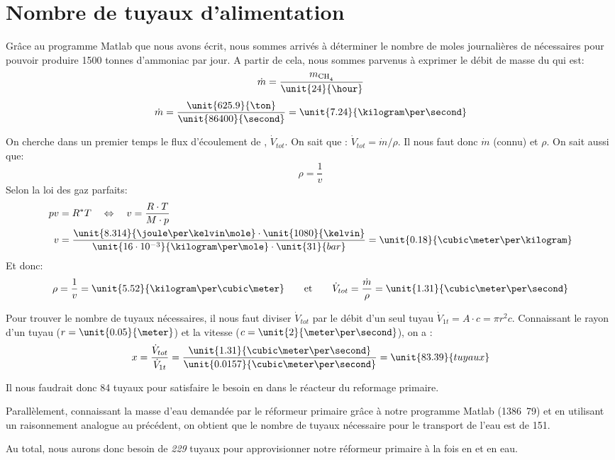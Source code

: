 \section{Nombre de tuyaux d'alimentation}

Grâce au programme Matlab que nous avons écrit, nous sommes arrivés à déterminer le nombre de moles journalières de  nécessaires pour pouvoir produire 1500 tonnes d'ammoniac par jour. A partir de cela, nous sommes parvenus à exprimer le débit de masse du  qui est:
    $$\dot{m}=\frac{m_{\ce{CH4}}}{\unit{24}{\hour}}$$
    $$\dot{m}=\frac{\unit{625.9}{\ton}}{\unit{86400}{\second}}=\unit{7.24}{\kilogram\per\second}$$

On cherche dans un premier temps le flux d'écoulement de , $\dot{V}_{tot}$. On sait que :
$\dot{V}_{tot}={\dot{m}}/{\rho}$.
Il nous faut donc $\dot{m}$ (connu) et $\rho$. On sait aussi que:
\[ \rho = \frac{1}{v} \]
Selon la loi des gaz parfaits:
\begin{align*}
    pv &= R^{*}T \quad\Leftrightarrow\quad v = \frac{R\cdot T}{M\cdot p} \\
    v &= \frac{\unit{8.314}{\joule\per\kelvin\mole}\cdot\unit{1080}{\kelvin}}{\unit{16\cdot10^{-3}}{\kilogram\per\mole}\cdot\unit{31}{bar}}=\unit{0.18}{\cubic\meter\per\kilogram}
\end{align*}
Et donc:
\[
    \rho = \frac{1}{v} = \unit{5.52}{\kilogram\per\cubic\meter}
    \qquad\text{et}\qquad
    \dot{V}_{tot} = \frac{\dot{m}}{\rho}=\unit{1.31}{\cubic\meter\per\second}
\]

Pour trouver le nombre de tuyaux nécessaires, il nous faut diviser $\dot{V}_{tot}$ par le débit d'un seul tuyau $\dot{V}_{1t} = A\cdot c = \pi r^2 c$. Connaissant le rayon d'un tuyau ($r=\unit{0.05}{\meter}$) et la vitesse ($c=\unit{2}{\meter\per\second}$), on a :
\[
    x = \frac{\dot{V}_{tot}}{\dot{V}_{1t}}
      = \frac{\unit{1.31}{\cubic\meter\per\second}}{\unit{0.0157}{\cubic\meter\per\second}}
      = \unit{83.39}{tuyaux}
\]

Il nous faudrait donc 84 tuyaux pour satisfaire le besoin en  dans le réacteur du reformage primaire.

Parallèlement, connaissant la masse d'eau demandée par le réformeur primaire grâce à notre programme Matlab (\unit{1386.79}{\ton}) et en utilisant un raisonnement analogue au précédent, on obtient que le nombre de tuyaux nécessaire pour le transport de l'eau est de 151.

Au total, nous aurons donc besoin de \emph{229} tuyaux pour approvisionner notre réformeur primaire à la fois en  et en eau.
